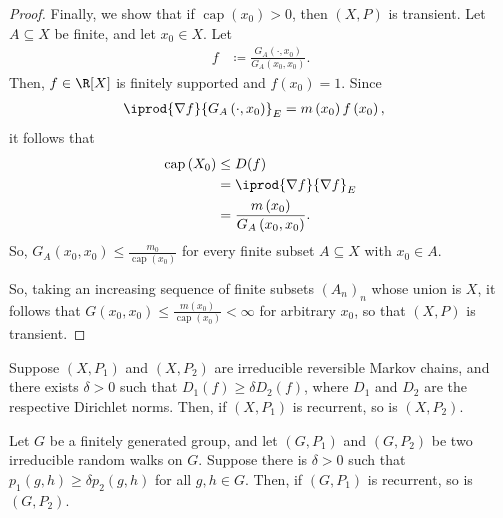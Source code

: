 \documentclass[10pt]{mypackage}
\renewcommand{\coloneq}{\coloneqq}
\begin{document}
\begin{proof}
  Finally, we show that if $\operatorname{cap}\left( x_0 \right) > 0$, then $\left( X,P \right)$ is transient. Let $A\subseteq X$ be finite, and let $x_0\in X$. Let
  \begin{align*}
    f &\coloneq \frac{G_A\left( \cdot,x_0 \right)}{G_A\left( x_0,x_0 \right)}.
  \end{align*}
  Then, $f\in \R[X]$ is finitely supported and $f\left( x_0 \right) = 1$. Since
  \begin{align*}
    \iprod{\nabla f}{G_A\left( \cdot,x_0 \right)}_{E} &= m\left( x_0 \right)f\left( x_0 \right),
  \end{align*}
  it follows that
  \begin{align*}
    \operatorname{cap}\left( X_0 \right) &\leq D(f)\\
                                         &= \iprod{\nabla f}{\nabla f}_{E}\\
                                         &= \frac{m\left( x_0 \right)}{G_A\left( x_0,x_0 \right)}.
  \end{align*}
  So, $G_A\left( x_0,x_0 \right)\leq \frac{m_0}{\operatorname{cap}\left( x_0 \right)}$ for every finite subset $A\subseteq X$ with $x_0\in A$.

  So, taking an increasing sequence of finite subsets $\left( A_n \right)_{n}$ whose union is $X$, it follows that $G\left( x_0,x_0 \right)\leq \frac{m\left( x_0 \right)}{\operatorname{cap}\left( x_0 \right)} < \infty$ for arbitrary $x_0$, so that $\left( X,P \right)$ is transient.
\end{proof}
\begin{corollary}
  Suppose $\left( X,P_1 \right)$ and $\left( X,P_2 \right)$ are irreducible reversible Markov chains, and there exists $\delta > 0$ such that $D_1(f)\geq \delta D_2(f)$, where $D_1$ and $D_2$ are the respective Dirichlet norms. Then, if $\left( X,P_1 \right)$ is recurrent, so is $\left( X,P_2 \right)$.
\end{corollary}
\begin{corollary}
  Let $G$ be a finitely generated group, and let $\left( G,P_1 \right)$ and $\left( G,P_2 \right)$ be two irreducible random walks on $G$. Suppose there is $\delta > 0$ such that $p_1\left( g,h \right)\geq \delta p_2\left( g,h \right)$ for all $g,h\in G$. Then, if $\left( G,P_1 \right)$ is recurrent, so is $\left( G,P_2 \right)$.
\end{corollary}
\end{document}
